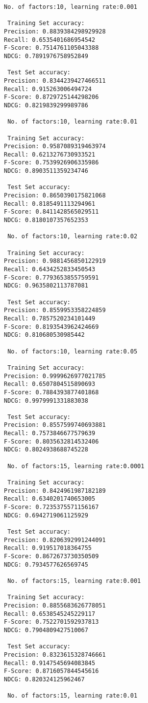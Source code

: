 \documentclass[11pt]{article}
\begin{document}
\begin{Verbatim}[commandchars=\\\{\}]
 No. of factors:10, learning rate:0.001

 Training Set accuracy:
Precision: 0.8839384298929928
Recall: 0.6535401686954542
F-Score: 0.7514761105043388
NDCG: 0.7891976758952849

 Test Set accuracy:
Precision: 0.8344239427466511
Recall: 0.915263006494724
F-Score: 0.8729725144298206
NDCG: 0.8219839299989786

 No. of factors:10, learning rate:0.01

 Training Set accuracy:
Precision: 0.9587089319463974
Recall: 0.6213276730933521
F-Score: 0.7539926906335986
NDCG: 0.8903511359234746

 Test Set accuracy:
Precision: 0.8650390175821068
Recall: 0.8185491113294961
F-Score: 0.8411428565029511
NDCG: 0.8180107357652353

 No. of factors:10, learning rate:0.02

 Training Set accuracy:
Precision: 0.9881456850122919
Recall: 0.6434252833450543
F-Score: 0.7793653855759591
NDCG: 0.9635802113787081

 Test Set accuracy:
Precision: 0.8559953358224859
Recall: 0.7857520234101449
F-Score: 0.8193543962424669
NDCG: 0.810680530985442

 No. of factors:10, learning rate:0.05

 Training Set accuracy:
Precision: 0.9999626977021785
Recall: 0.6507804515890693
F-Score: 0.7884393877401868
NDCG: 0.9979991331883038

 Test Set accuracy:
Precision: 0.8557599740693881
Recall: 0.7573846677579639
F-Score: 0.8035632814532406
NDCG: 0.8024938688745228

 No. of factors:15, learning rate:0.0001

 Training Set accuracy:
Precision: 0.8424961987182189
Recall: 0.6340201740653005
F-Score: 0.7235375571156167
NDCG: 0.6942719061125929

 Test Set accuracy:
Precision: 0.8206392991244091
Recall: 0.919517018364755
F-Score: 0.8672673730350509
NDCG: 0.7934577626569745

 No. of factors:15, learning rate:0.001

 Training Set accuracy:
Precision: 0.8855683626778051
Recall: 0.6538545245229117
F-Score: 0.7522701592937813
NDCG: 0.7904809427510067

 Test Set accuracy:
Precision: 0.8323615328746661
Recall: 0.9147545694083845
F-Score: 0.8716057844545616
NDCG: 0.820324125962467

 No. of factors:15, learning rate:0.01


\end{Verbatim}
\end{document}

